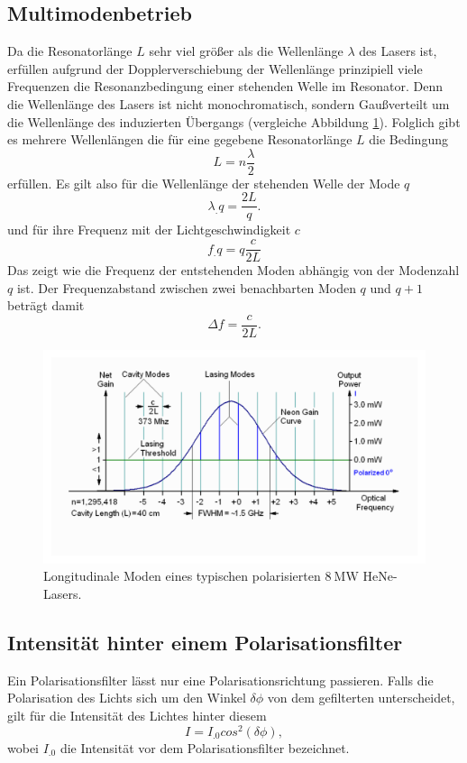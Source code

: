 \subsection{Multimodenbetrieb}
Da die Resonatorlänge $L$ sehr viel größer als die Wellenlänge $\lambda$ des Lasers ist, erfüllen aufgrund der Dopplerverschiebung der Wellenlänge prinzipiell viele Frequenzen die Resonanzbedingung einer stehenden Welle im Resonator.
Denn die Wellenlänge des Lasers ist nicht monochromatisch, sondern Gaußverteilt um die Wellenlänge des induzierten Übergangs (vergleiche Abbildung \ref{fig:doppler}). 
Folglich gibt es mehrere Wellenlängen die für eine gegebene Resonatorlänge $L$ die Bedingung 
\[
L = n\frac{\lambda}{2}
\]
erfüllen. 
Es gilt also für die Wellenlänge der stehenden Welle der Mode $q$
\[
\lambda_.q = \frac{2L}{q}\text{.}
\]
und für ihre Frequenz mit der Lichtgeschwindigkeit $c$
\[
f_.q = q\frac{c}{2L}
\]
Das zeigt wie die Frequenz der entstehenden Moden abhängig von der Modenzahl $q$ ist. 
Der Frequenzabstand zwischen zwei benachbarten Moden $q$ und $q+1$ beträgt damit
\[
\Delta f = \frac{c}{2L}\text{.}
\]

\begin{figure}
	\centering
	\includegraphics[width=\linewidth-50pt,height=\textheight-100pt,keepaspectratio]{content/images/multimode2.pdf}
	\caption{Longitudinale Moden eines typischen polarisierten $\SI{8}{\mega\watt}$ HeNe-Lasers.}
	\label{fig:doppler}
\end{figure}

\subsection{Intensität hinter einem Polarisationsfilter}
Ein Polarisationsfilter lässt nur eine Polarisationsrichtung passieren. Falls die Polarisation des Lichts sich um den Winkel $\delta\phi$ von dem gefilterten unterscheidet, gilt für die Intensität des Lichtes hinter diesem
\begin{equation}
	I=I_.0 cos^2(\delta\phi), \label{eq:polar}
\end{equation}
wobei $I_.0$ die Intensität vor dem Polarisationsfilter bezeichnet.


